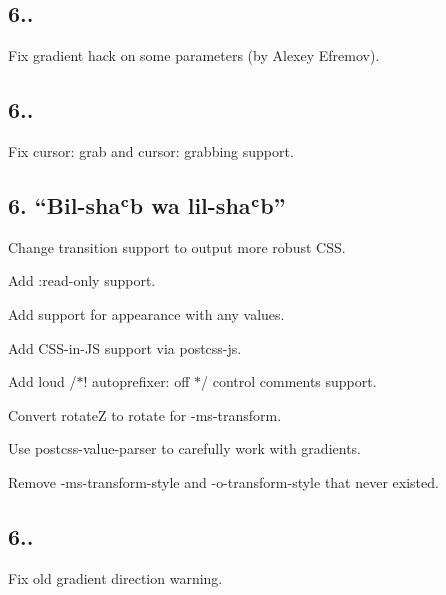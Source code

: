 \subsection*{6..}


\begin{DoxyItemize}
\item Fix gradient hack on some parameters (by Alexey Efremov).
\end{DoxyItemize}

\subsection*{6..}


\begin{DoxyItemize}
\item Fix {\ttfamily cursor\+: grab} and {\ttfamily cursor\+: grabbing} support.
\end{DoxyItemize}

\subsection*{6. “\+Bil-\/shaʿb wa lil-\/shaʿb”}


\begin{DoxyItemize}
\item Change {\ttfamily transition} support to output more robust C\+SS.
\item Add {\ttfamily \+:read-\/only} support.
\item Add support for {\ttfamily appearance} with any values.
\item Add C\+S\+S-\/in-\/\+JS support via {\ttfamily postcss-\/js}.
\item Add loud {\ttfamily /$\ast$! autoprefixer\+: off $\ast$/} control comments support.
\item Convert {\ttfamily rotateZ} to {\ttfamily rotate} for {\ttfamily -\/ms-\/transform}.
\item Use {\ttfamily postcss-\/value-\/parser} to carefully work with gradients.
\item Remove {\ttfamily -\/ms-\/transform-\/style} and {\ttfamily -\/o-\/transform-\/style} that never existed.
\end{DoxyItemize}

\subsection*{6..}


\begin{DoxyItemize}
\item Fix old gradient direction warning.
\end{DoxyItemize}

